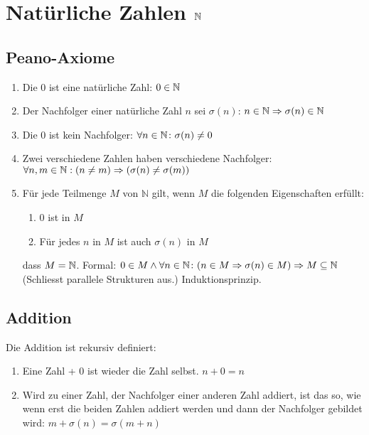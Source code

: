 \section{Natürliche Zahlen $\mathbb{N}$}
\subsection{Peano-Axiome}
\begin{enumerate}
\item Die 0 ist eine natürliche Zahl: $0 \in \mathbb{N}$
\item Der Nachfolger einer natürliche Zahl $n$ sei $\sigma(n)$: $n \in \mathbb{N} \Rightarrow \sigma(n) \in \mathbb{N}$
\item Die 0 ist kein Nachfolger: $\forall n \in \mathbb{N} \colon \sigma(n) \neq 0$
\item Zwei verschiedene Zahlen haben verschiedene Nachfolger: $\forall n, m \in \mathbb{N}: (n \neq m) \Rightarrow (\sigma(n) \neq \sigma(m))$
\item Für jede Teilmenge $M$ von $\mathbb{N}$ gilt, wenn $M$ die folgenden Eigenschaften erfüllt:
	\begin{enumerate}
		\item 0 ist in $M$
		\item Für jedes $n$ in $M$ ist auch $\sigma(n)$ in $M$
	\end{enumerate}
	dass $M = \mathbb{N}$. Formal: $0\in M \wedge \forall n \in \mathbb{N} \colon (n \in M \Rightarrow \sigma(n)\in M) \Rightarrow M \subseteq \mathbb{N}$\\
	(Schliesst parallele Strukturen aus.) Induktionsprinzip.
\end{enumerate}

\subsection{Addition}
Die Addition ist rekursiv definiert:
\begin{enumerate}
	\item Eine Zahl + 0 ist wieder die Zahl selbst. $n + 0 = n$
	\item Wird zu einer Zahl, der Nachfolger einer anderen Zahl addiert, ist das so, wie wenn
	erst die beiden Zahlen addiert werden und dann der Nachfolger gebildet wird: $m + \sigma(n) = \sigma(m + n)$
\end{enumerate}

